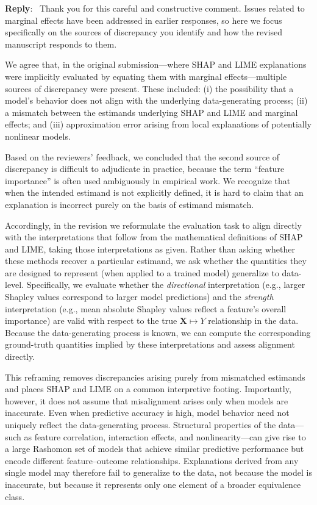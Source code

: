 \documentclass[11pt]{article}
\newcounter{se}[section]
\newcounter{reviewer}
\newenvironment{reply}
 {\par\medskip \noindent \begin{sf}\textbf{Reply}:\ }
 {\medskip \end{sf}}
\begin{document}
\begin{reply}
Thank you for this careful and constructive comment. Issues related to marginal effects have been addressed in earlier responses, so here we focus specifically on the sources of discrepancy you identify and how the revised manuscript responds to them.

We agree that, in the original submission—where SHAP and LIME explanations were implicitly evaluated by equating them with marginal effects—multiple sources of discrepancy were present. These included: (i) the possibility that a model’s behavior does not align with the underlying data-generating process; (ii) a mismatch between the estimands underlying SHAP and LIME and marginal effects; and (iii) approximation error arising from local explanations of potentially nonlinear models.

Based on the reviewers’ feedback, we concluded that the second source of discrepancy is difficult to adjudicate in practice, because the term “feature importance” is often used ambiguously in empirical work. We recognize that when the intended estimand is not explicitly defined, it is hard to claim that an explanation is incorrect purely on the basis of estimand mismatch.

Accordingly, in the revision we reformulate the evaluation task to align directly with the interpretations that follow from the mathematical definitions of SHAP and LIME, taking those interpretations as given. Rather than asking whether these methods recover a particular estimand, we ask whether the quantities they are designed to represent (when applied to a trained model) generalize to data-level. Specifically, we evaluate whether the \emph{directional} interpretation (e.g., larger Shapley values correspond to larger model predictions) and the \emph{strength} interpretation (e.g., mean absolute Shapley values reflect a feature’s overall importance) are valid with respect to the true $\mathbf{X}\mapsto Y$ relationship in the data. Because the data-generating process is known, we can compute the corresponding ground-truth quantities implied by these interpretations and assess alignment directly.

This reframing removes discrepancies arising purely from mismatched estimands and places SHAP and LIME on a common interpretive footing. Importantly, however, it does not assume that misalignment arises only when models are inaccurate. Even when predictive accuracy is high, model behavior need not uniquely reflect the data-generating process. Structural properties of the data—such as feature correlation, interaction effects, and nonlinearity—can give rise to a large Rashomon set of models that achieve similar predictive performance but encode different feature–outcome relationships. Explanations derived from any single model may therefore fail to generalize to the data, not because the model is inaccurate, but because it represents only one element of a broader equivalence class.


\end{reply}
\end{document}
